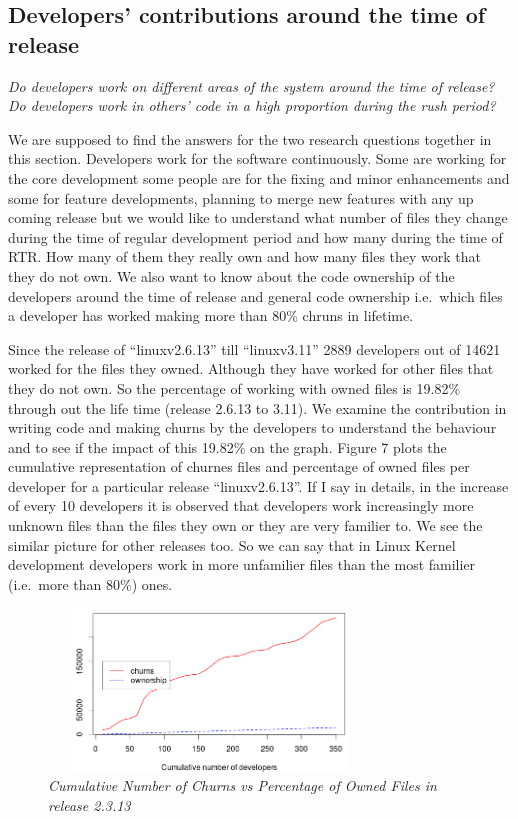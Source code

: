 \documentclass{acm_proc_article-sp}
\begin{document}
\subsection{Developers' contributions around the time of release}
\textit{Do developers work on different areas of the system around the time of release?}\newline
\textit{Do developers work in others' code in a high proportion during the rush period?}

We are supposed to find the answers for the two research questions together in this section. Developers work for the software continuously. Some are working for the core development some people are for the fixing and minor enhancements and some for feature developments, planning to merge new features with any up coming release but we would like to understand what number of files they change during the time of regular development period and how many during the time of RTR. How many of them they really own and how many files they work that they do not own. We also want to know about the code ownership of the developers around the time of release and general code ownership i.e.\ which files a developer has worked making more than 80\% chruns in lifetime.

Since the release of ``linuxv2.6.13'' till ``linuxv3.11'' 2889 developers out of 14621 worked for the files they owned. Although they have worked for other files that they do not own. So the percentage of working with owned files is 19.82\% through out the life time (release 2.6.13 to 3.11). We examine the contribution in writing code and making churns by the developers to understand the behaviour and to see if the impact of this 19.82\% on the graph. Figure 7 plots the cumulative representation of churnes files and percentage of owned files per developer for a particular release ``linuxv2.6.13''. If I say in details, in the increase of every 10 developers it is observed that developers work increasingly more unknown files than the files they own or they are very familier to. We see the similar picture for other releases too.
So we can say that in Linux Kernel development developers work in more unfamilier files than the most familier (i.e.\ more than 80\%) ones.
\begin{figure}
\begin{center}
\includegraphics[height=1.7in,width=3.4in]{cumulativeChurnOwnershipPercent.png}
\caption{\small \sl Cumulative Number of Churns vs Percentage of Owned Files in release 2.3.13}
\end{center}
\end{figure}
\end{document}
